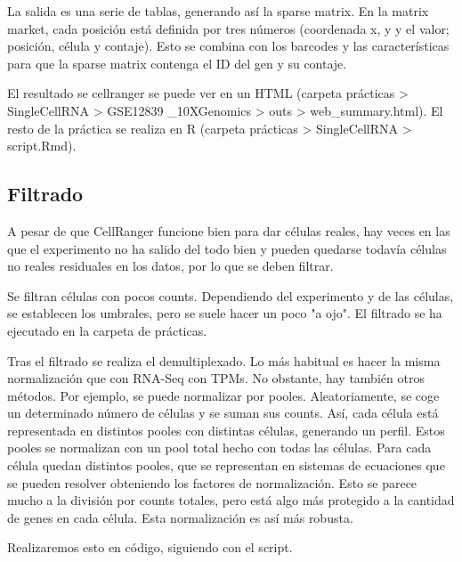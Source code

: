 La salida es una serie de tablas, generando así la sparse matrix. En la matrix market, cada posición está definida por tres números (coordenada x, y y el valor; posición, célula y contaje). Esto se combina con los barcodes y las características para que la sparse matrix contenga el ID del gen y su contaje. 

El resultado se cellranger se puede ver en un HTML (carpeta prácticas > SingleCellRNA > GSE12839 \_10XGenomics > outs > web\_summary.html). El resto de la práctica se realiza en R (carpeta prácticas > SingleCellRNA > script.Rmd).

\subsection{Filtrado}
A pesar de que CellRanger funcione bien para dar células reales, hay veces en las que el experimento no ha salido del todo bien y pueden quedarse todavía células no reales residuales en los datos, por lo que se deben filtrar. 

Se filtran células con pocos counts. Dependiendo del experimento y de las células, se establecen los umbrales, pero se suele hacer un poco "a ojo". El filtrado se ha ejecutado en la carpeta de prácticas.

Tras el filtrado se realiza el demultiplexado. Lo más habitual es hacer la misma normalización que con RNA-Seq con TPMs. No obstante, hay también otros métodos. Por ejemplo, se puede normalizar por pooles. Aleatoriamente, se coge un determinado número de células y se suman sus counts. Así, cada célula está representada en distintos pooles con distintas células, generando un perfil. Estos pooles se normalizan con un pool total hecho con todas las células. Para cada célula quedan distintos pooles, que se representan en sistemas de ecuaciones que se pueden resolver obteniendo los factores de normalización. Esto se parece mucho a la división por counts totales, pero está algo más protegido a la cantidad de genes en cada célula. Esta normalización es así más robusta. 

Realizaremos esto en código, siguiendo con el script. 

